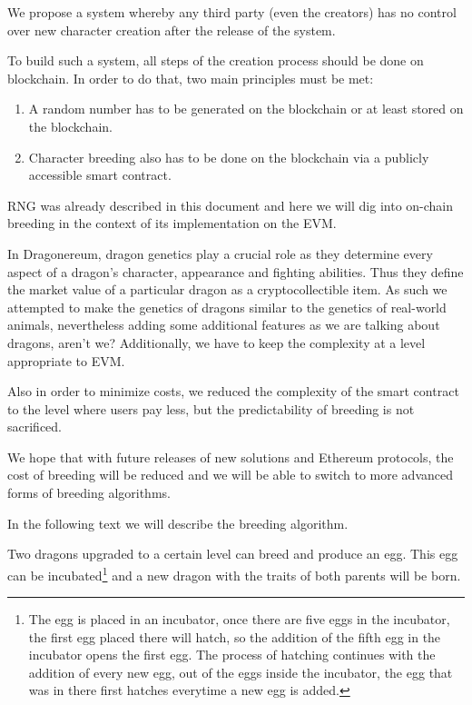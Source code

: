 \documentclass[12pt]{article}
\begin{document}
We propose a system whereby any third party (even the creators) has no control over new character creation after the release of the system.\par

To build such a system, all steps of the creation process should be done on blockchain. In order to do that, two main principles must be met:\par

\begin{enumerate}
	\item A random number has to be generated on the blockchain or at least stored on the blockchain.\par

	\item Character breeding also has to be done on the blockchain via a publicly accessible smart contract.
\end{enumerate}\par

RNG was already described in this document and here we will dig into on-chain breeding in the context of its implementation on the EVM.\par

In Dragonereum, dragon genetics play a crucial role as they determine every aspect of a dragon’s character, appearance and fighting abilities. Thus they define the market value of a particular dragon as a cryptocollectible item. As such we attempted to make the genetics of dragons similar to the genetics of real-world animals, nevertheless adding some additional features as we are talking about dragons, aren’t we? Additionally, we have to keep the complexity at a level appropriate to EVM.\par

Also in order to minimize costs, we reduced the complexity of the smart contract to the level where users pay less, but the predictability of breeding is not sacrificed.\par

We hope that with future releases of new solutions and Ethereum protocols, the cost of breeding will be reduced and we will be able to switch to more advanced forms of breeding algorithms.\par

In the following text we will describe the breeding algorithm.\par

Two dragons upgraded to a certain level can breed and produce an egg. This egg can be incubated\footnote{The egg is placed in an incubator, once there are five eggs in the incubator, the first egg placed there will hatch, so the addition of the fifth egg in the incubator opens the first egg. The process of hatching continues with the addition of every new egg, out of the eggs inside the incubator, the egg that was in there first hatches everytime a new egg is added.}  and a new dragon with the traits of both parents will be born.\par
\end{document}
